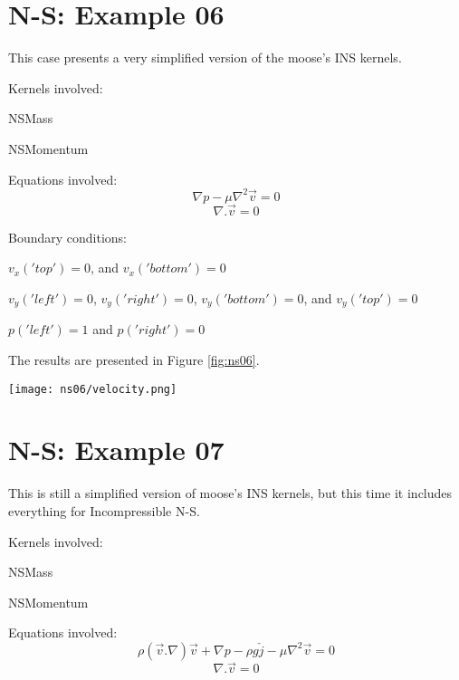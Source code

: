 \documentclass[11pt,letterpaper]{article}
\begin{document}
\section{N-S: Example 06}

This case presents a very simplified version of the moose's INS kernels.

Kernels involved:
\begin{description}[font=$\bullet$\scshape\bfseries]
	\item[] NSMass
	\item[] NSMomentum
\end{description}

Equations involved:
\begin{equation}
\nabla p - \mu \nabla^{2}\vec{v} = 0
\end{equation}
\begin{equation}
\nabla.\vec{v}=0
\end{equation}

Boundary conditions:
\begin{description}[]
	\item[] $v_{x}('top')=0$, and $v_{x}('bottom')=0$
	\item[] $v_{y}('left')=0$, $v_{y}('right')=0$, $v_{y}('bottom')=0$, and $v_{y}('top')=0$
	\item[] $p('left')=1$ and $p('right')=0$
\end{description}

The results are presented in Figure \ref{fig:ns06}.
\begin{figure*}[!h]
	\centering
	\texttt{[image: ns06/velocity.png]} 
	\hfill
	\caption{Velocity.}
	\label{fig:ns06}
\end{figure*}

\section{N-S: Example 07}

This is still a simplified version of moose's INS kernels, but this time it includes everything for Incompressible N-S.

Kernels involved:
\begin{description}[font=$\bullet$\scshape\bfseries]
	\item[] NSMass
	\item[] NSMomentum
\end{description}

Equations involved:
\begin{equation}
\rho (\vec{v}.\nabla)\vec{v} + \nabla p - \rho g \check{j} - \mu \nabla^{2}\vec{v} = 0
\end{equation}
\begin{equation}
\nabla.\vec{v}=0
\end{equation}
\end{document}
